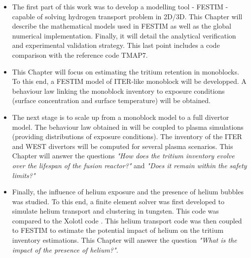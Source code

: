 \begin{itemize}
    \item \textbf{} \newline
The first part of this work was to develop a modelling tool - FESTIM - capable of solving hydrogen transport problem in 2D/3D.
This Chapter will describe the mathematical models used in FESTIM as well as the global numerical implementation.
Finally, it will detail the analytical verification and experimental validation strategy.
This last point includes a code comparison with the reference code TMAP7.
    \item \textbf{} \newline
This Chapter will focus on estimating the tritium retention in monoblocks.
To this end, a FESTIM model of ITER-like monoblock will be developped.
A behaviour law linking the monoblock inventory to exposure conditions (surface concentration and surface temperature) will be obtained.
    \item \textbf{} \newline
The next stage is to scale up from a monoblock model to a full divertor model.
The behaviour law obtained in  will be coupled to plasma simulations (providing distributions of exposure conditions).
The inventory of the ITER and WEST divertors will be computed for several plasma scenarios.
This Chapter will answer the questions \textit{"How does the tritium inventory evolve over the lifespan of the fusion reactor?"} and
\textit{"Does it remain within the safety limits?"}
    \item \textbf{} \newline
Finally, the influence of helium exposure and the presence of helium bubbles was studied.
To this end, a finite element solver was first developed to simulate helium transport and clustering in tungsten.
This code was compared to the Xolotl code .
This helium transport code was then coupled to FESTIM to estimate the potential impact of helium on the tritium inventory estimations.
This Chapter will answer the question \textit{"What is the impact of the presence of helium?"}.
\end{itemize}
